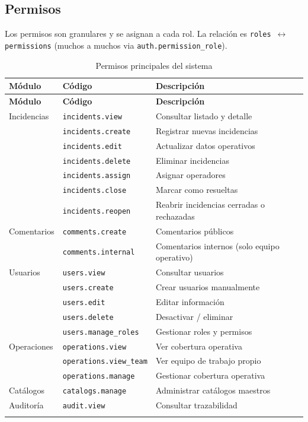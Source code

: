 \documentclass[11pt, a4paper]{article}
\begin{document}
\subsection{Permisos}

Los permisos son granulares y se asignan a cada rol. La relación es \texttt{roles $\leftrightarrow$ permissions} (muchos a muchos via \texttt{auth.permission\_role}).

\begin{longtable}{l l p{7.5cm}}
  \toprule
  \textbf{Módulo} & \textbf{Código} & \textbf{Descripción} \\
  \midrule
  \endfirsthead
  \toprule
  \textbf{Módulo} & \textbf{Código} & \textbf{Descripción} \\
  \midrule
  \endhead
  Incidencias & \texttt{incidents.view}    & Consultar listado y detalle \\
              & \texttt{incidents.create}  & Registrar nuevas incidencias \\
              & \texttt{incidents.edit}    & Actualizar datos operativos \\
              & \texttt{incidents.delete}  & Eliminar incidencias \\
              & \texttt{incidents.assign}  & Asignar operadores \\
              & \texttt{incidents.close}   & Marcar como resueltas \\
              & \texttt{incidents.reopen}  & Reabrir incidencias cerradas o rechazadas \\
  \midrule
  Comentarios & \texttt{comments.create}   & Comentarios públicos \\
              & \texttt{comments.internal} & Comentarios internos (solo equipo operativo) \\
  \midrule
  Usuarios    & \texttt{users.view}         & Consultar usuarios \\
              & \texttt{users.create}       & Crear usuarios manualmente \\
              & \texttt{users.edit}         & Editar información \\
              & \texttt{users.delete}       & Desactivar / eliminar \\
              & \texttt{users.manage\_roles} & Gestionar roles y permisos \\
  \midrule
  Operaciones & \texttt{operations.view}       & Ver cobertura operativa \\
              & \texttt{operations.view\_team}  & Ver equipo de trabajo propio \\
              & \texttt{operations.manage}     & Gestionar cobertura operativa \\
  \midrule
  Catálogos   & \texttt{catalogs.manage}       & Administrar catálogos maestros \\
  \midrule
  Auditoría   & \texttt{audit.view}            & Consultar trazabilidad \\
  \bottomrule
  \caption{Permisos principales del sistema}
\end{longtable}
\end{document}

